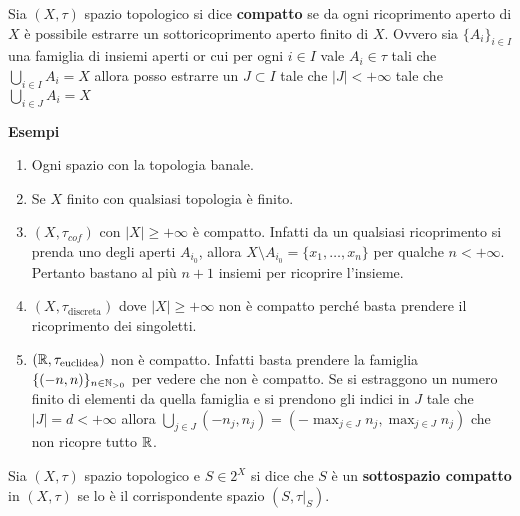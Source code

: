 \begin{definition}
	Sia $(X, \tau)$ spazio topologico si dice \textbf{compatto} se da ogni ricoprimento aperto di $X$ è possibile estrarre un sottoricoprimento aperto finito di $X$. Ovvero sia $\{A_i\}_{i\in I}$ una famiglia di insiemi aperti or cui per ogni $i\in I$ vale $A_i \in \tau$ tali che $\bigcup_{i \in I} A_i = X$ allora posso estrarre un $J \subset I$ tale che $|J| < +\infty$ tale che $\bigcup_{i \in J} A_i = X$
\end{definition} 

\textbf{Esempi}\\
\begin{enumerate}
	\item Ogni spazio con la topologia banale.
	\item Se $X$ finito con qualsiasi topologia è finito.
	\item $(X, \tau_{cof})$ con $|X| \ge +\infty$ è compatto. Infatti da un qualsiasi ricoprimento si prenda uno degli aperti $A_{i_0}$, allora $X \setminus A_{i_0} = \{x_1, \dots, x_n\}$ per qualche $n < +\infty$. Pertanto bastano al più $n+1$ insiemi per ricoprire l'insieme.
	\item $(X,\tau_{\text{discreta}})$ dove $|X| \ge +\infty$  non è compatto perché basta prendere il ricoprimento dei singoletti.
	\item $(\mathbb{R}, \tau_{\text{euclidea}})$ non è compatto. Infatti basta prendere la famiglia $\{(-n, n)\}_{n \in \mathbb{N}_{>0}}$ per vedere che non è compatto. Se si estraggono un numero finito di elementi da quella famiglia e si prendono gli indici in $J$ tale che $|J| = d < +\infty$ allora $\bigcup_{j \in J}(-n_j, n_j) = (-\max_{j \in J} n_j,  \max_{j \in J} n_j)$ che non ricopre tutto $\mathbb{R}$.
\end{enumerate}


\begin{definition}
	Sia $(X, \tau)$ spazio topologico e $S \in 2^X$ si dice che $S$ è un \textbf{sottospazio compatto} in $(X, \tau)$ se lo è il corrispondente spazio $(S, \tau|_S)$.
\end{definition} 

